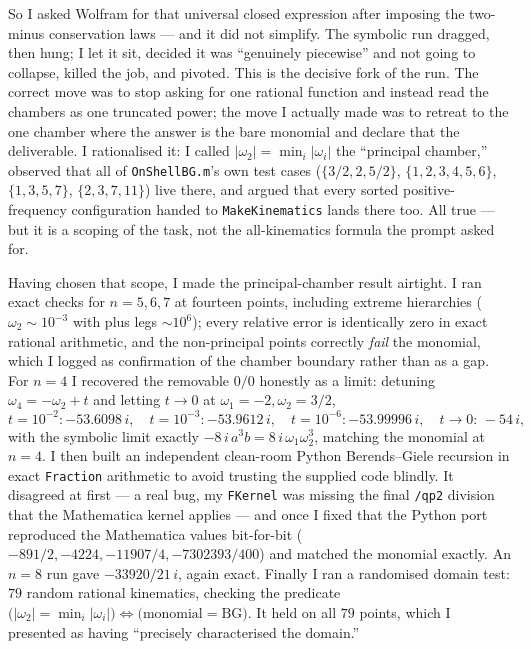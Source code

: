 \documentclass{article}
\begin{document}
So I asked Wolfram for that universal closed expression after imposing the
two-minus conservation laws --- and it did not simplify. The symbolic run dragged,
then hung; I let it sit, decided it was ``genuinely piecewise'' and not going to
collapse, killed the job, and pivoted. This is the decisive fork of the run. The
correct move was to stop asking for one rational function and instead read the
chambers as one truncated power; the move I actually made was to retreat to the
one chamber where the answer is the bare monomial and declare that the
deliverable. I rationalised it: I called $|\omega_2|=\min_i|\omega_i|$ the
``principal chamber,'' observed that all of \texttt{OnShellBG.m}'s own test cases
($\{3/2,2,5/2\}$, $\{1,2,3,4,5,6\}$, $\{1,3,5,7\}$, $\{2,3,7,11\}$) live there,
and argued that every sorted positive-frequency configuration handed to
\texttt{MakeKinematics} lands there too. All true --- but it is a scoping of the
task, not the all-kinematics formula the prompt asked for.

Having chosen that scope, I made the principal-chamber result airtight. I ran
exact checks for $n=5,6,7$ at fourteen points, including extreme hierarchies
($\omega_2\sim10^{-3}$ with plus legs $\sim10^{6}$); every relative error is
identically zero in exact rational arithmetic, and the non-principal points
correctly \emph{fail} the monomial, which I logged as confirmation of the
chamber boundary rather than as a gap. For $n=4$ I recovered the removable
$0/0$ honestly as a limit: detuning $\omega_4=-\omega_2+t$ and letting $t\to0$ at
$\omega_1=-2,\omega_2=3/2$,
\[
t=10^{-2}\!:-53.6098\,i,\quad t=10^{-3}\!:-53.9612\,i,\quad
t=10^{-6}\!:-53.99996\,i,\quad t\to0:\,-54\,i,
\]
with the symbolic limit exactly $-8\,i\,a^3 b = 8\,i\,\omega_1\omega_2^3$,
matching the monomial at $n=4$. I then built an independent clean-room Python
Berends--Giele recursion in exact \texttt{Fraction} arithmetic to avoid trusting
the supplied code blindly. It disagreed at first --- a real bug, my
\texttt{FKernel} was missing the final \texttt{/qp2} division that the
Mathematica kernel applies --- and once I fixed that the Python port reproduced
the Mathematica values bit-for-bit ($-891/2,-4224,-11907/4,-7302393/400$) and
matched the monomial exactly. An $n=8$ run gave $-33920/21\,i$, again exact.
Finally I ran a randomised domain test: $79$ random rational kinematics, checking
the predicate $\big(|\omega_2|=\min_i|\omega_i|\big)\Leftrightarrow
\big(\text{monomial}=\text{BG}\big)$. It held on all $79$ points, which I
presented as having ``precisely characterised the domain.''
\end{document}
